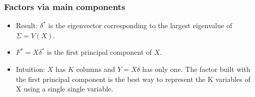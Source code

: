 \documentclass[
  shownotes,
  xcolor={svgnames},
  hyperref={colorlinks,citecolor=DarkBlue,linkcolor=DarkRed,urlcolor=DarkBlue}
  , aspectratio=169]{beamer}
\begin{document}
\begin{frame}
\frametitle{Factors via main components}

\begin{itemize}
\item Result: $\delta^*$ is the eigenvector corresponding to the largest eigenvalue of $\Sigma = V (X)$.
\medskip
\item $F^* = X\delta^*$ is the first principal component of $X$.
\medskip
\item Intuition: $X$ has $K$ columns and $Y = X\delta$ has only one. The factor built with the first principal component is the best way to represent the K variables of X using a single single variable.
\end{itemize}

\end{frame}

\end{document}
